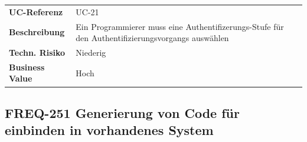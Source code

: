 \begin{longtable}[c]{@{}ll@{}}
\toprule
\begin{minipage}[t]{0.20\columnwidth}\raggedright\strut
\textbf{UC-Referenz}
\strut\end{minipage} &
\begin{minipage}[t]{0.74\columnwidth}\raggedright\strut
UC-21
\strut\end{minipage}\tabularnewline
\begin{minipage}[t]{0.20\columnwidth}\raggedright\strut
\textbf{Beschreibung}
\strut\end{minipage} &
\begin{minipage}[t]{0.74\columnwidth}\raggedright\strut
Ein Programmierer muss eine Authentifizerungs-Stufe für den
Authentifizierungsvorgangs auswählen
\strut\end{minipage}\tabularnewline
\begin{minipage}[t]{0.20\columnwidth}\raggedright\strut
\textbf{Techn. Risiko}
\strut\end{minipage} &
\begin{minipage}[t]{0.74\columnwidth}\raggedright\strut
Niederig
\strut\end{minipage}\tabularnewline
\begin{minipage}[t]{0.20\columnwidth}\raggedright\strut
\textbf{Business Value}
\strut\end{minipage} &
\begin{minipage}[t]{0.74\columnwidth}\raggedright\strut
Hoch
\strut\end{minipage}\tabularnewline
\bottomrule
\end{longtable}

\subsection{FREQ-251 Generierung von Code für einbinden in vorhandenes
System}\label{freq-251-generierung-von-code-fuxfcr-einbinden-in-vorhandenes-system}

